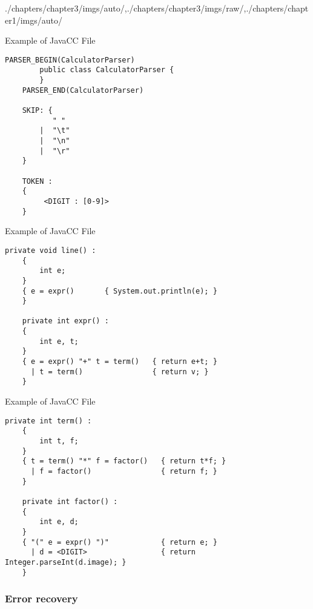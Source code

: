 \begin{graphicspathcontext}{{./chapters/chapter3/imgs/auto/},{./chapters/chapter3/imgs/raw/},{./chapters/chapter1/imgs/auto/}}
\begin{bibunit}[apalike]
\begin{frame}[fragile]{Example of JavaCC File }
	\begin{lstlisting}[style=lststyle-java]
	PARSER_BEGIN(CalculatorParser)
	    public class CalculatorParser {
	    }
	PARSER_END(CalculatorParser)

	SKIP: {
	       " "
	    |  "\t"
	    |  "\n"
	    |  "\r"
	}

	TOKEN :
	{
	     <DIGIT : [0-9]>
	}
	\end{lstlisting}
\end{frame}

\begin{frame}[fragile]{Example of JavaCC File }
	\begin{lstlisting}[style=lststyle-java]
	private void line() :
	{
	    int e;
	}
	{ e = expr()       { System.out.println(e); }
	}

	private int expr() :
	{
	    int e, t;
	}
	{ e = expr() "+" t = term()   { return e+t; }
	  | t = term()                { return v; }
	}
	\end{lstlisting}
\end{frame}

\begin{frame}[fragile]{Example of JavaCC File }
	\begin{lstlisting}[style=lststyle-java]
	private int term() :
	{
	    int t, f;
	}
	{ t = term() "*" f = factor()   { return t*f; }
	  | f = factor()                { return f; }
	}

	private int factor() :
	{
	    int e, d;
	}
	{ "(" e = expr() ")"            { return e; }
	  | d = <DIGIT>                 { return Integer.parseInt(d.image); }
	}
	\end{lstlisting}
\end{frame}

\subsubsection{Error recovery}
\subsubsectiontableofcontentslide


\end{bibunit}
\end{graphicspathcontext}
